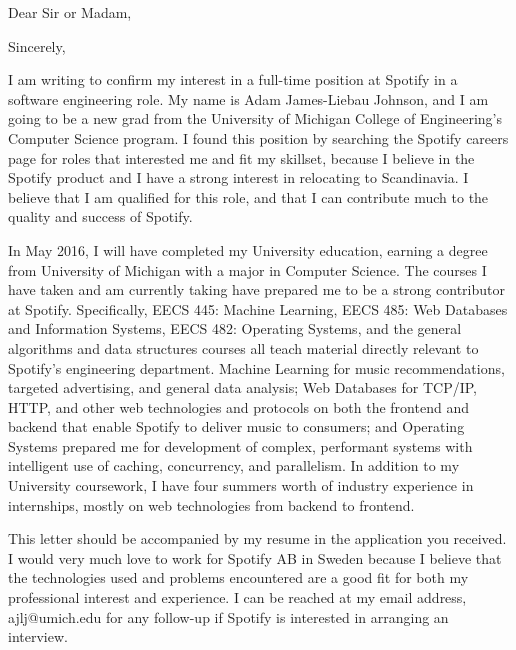 \documentclass[11pt,a4paper,sans]{moderncv}        %
\title{}                               %
\newcommand{\tab}[1]{\hspace*{50pt}}
\begin{document}
\date{\today}
\opening{Dear Sir or Madam,}
\closing{Sincerely,}
\makelettertitle

\tab a I am writing to confirm my interest in a full-time position at Spotify in a software engineering role. My name is Adam James-Liebau Johnson, and I am going to be a new grad from the University of Michigan College of Engineering's Computer Science program. I found this position by searching the Spotify careers page for roles that interested me and fit my skillset, because I believe in the Spotify product and I have a strong interest in relocating to Scandinavia. I believe that I am qualified for this role, and that I can contribute much to the quality and success of Spotify.

\tab a In May 2016, I will have completed my University education, earning a degree from University of Michigan with a major in Computer Science. The courses I have taken and am currently taking have prepared me to be a strong contributor at Spotify. Specifically, EECS 445: Machine Learning, EECS 485: Web Databases and Information Systems, EECS 482: Operating Systems, and the general algorithms and data structures courses all teach material directly relevant to Spotify's engineering department. Machine Learning for music recommendations, targeted advertising, and general data analysis; Web Databases for TCP/IP, HTTP, and other web technologies and protocols on both the frontend and backend that enable Spotify to deliver music to consumers; and Operating Systems prepared me for development of complex, performant systems with intelligent use of caching, concurrency, and parallelism. In addition to my University coursework, I have four summers worth of industry experience in internships, mostly on web technologies from backend to frontend. 

\tab a This letter should be accompanied by my resume in the application you received. I would very much love to work for Spotify AB in Sweden because I believe that the technologies used and problems encountered are a good fit for both my professional interest and experience. I can be reached at my email address, ajlj@umich.edu for any follow-up if Spotify is interested in arranging an interview.
\\
\makeletterclosing
\end{document}
